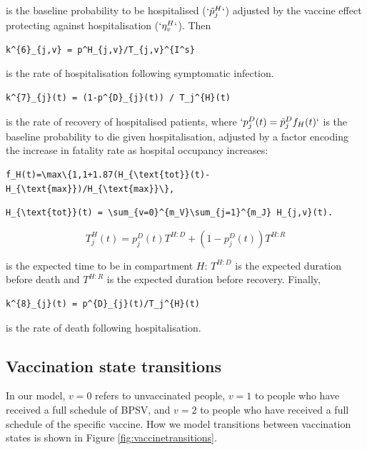\documentclass[
]{article}
\begin{document}
is the baseline probability to be hospitalised (\(`\tilde{p}^{H}_{j}`\)) adjusted by the vaccine effect protecting against hospitalisation (\(`\eta^{H}_{v}`\)). Then

\begin{verbatim}
k^{6}_{j,v} = p^H_{j,v}/T_{j,v}^{I^s}
\end{verbatim}

is the rate of hospitalisation following symptomatic infection.

\begin{verbatim}
k^{7}_{j}(t) = (1-p^{D}_{j}(t)) / T_j^{H}(t)
\end{verbatim}

is the rate of recovery of hospitalised patients, where \(`p^{D}_{j}(t)=\tilde{p}^{D}_{j}f_H(t)`\) is the baseline probability to die given hospitalisation, adjusted by a factor encoding the increase in fatality rate as hospital occupancy increases:

\begin{verbatim}
f_H(t)=\max\{1,1+1.87(H_{\text{tot}}(t)-H_{\text{max}})/H_{\text{max}}\},
\end{verbatim}

\begin{verbatim}
H_{\text{tot}}(t) = \sum_{v=0}^{m_V}\sum_{j=1}^{m_J} H_{j,v}(t).
\end{verbatim}

\[T_j^{H}(t) = p_j^{D}(t)T^{H:D} + (1-p_{j}^{D}(t))T^{H:R}\]

is the expected time to be in compartment \(H\): \(T^{H:D}\) is the expected duration before death and \(T^{H:R}\) is the expected duration before recovery. Finally,

\begin{verbatim}
k^{8}_{j}(t) = p^{D}_{j}(t)/T_j^{H}(t)
\end{verbatim}

is the rate of death following hospitalisation.

\hypertarget{vaccination-state-transitions}{%
\subsection{Vaccination state transitions}\label{vaccination-state-transitions}}

In our model, \(v=0\) refers to unvaccinated people, \(v=1\) to people who have received a full schedule of BPSV, and \(v=2\) to people who have received a full schedule of the specific vaccine. How we model transitions between vaccination states is shown in Figure \ref{fig:vaccinetransitions}.
\end{document}
